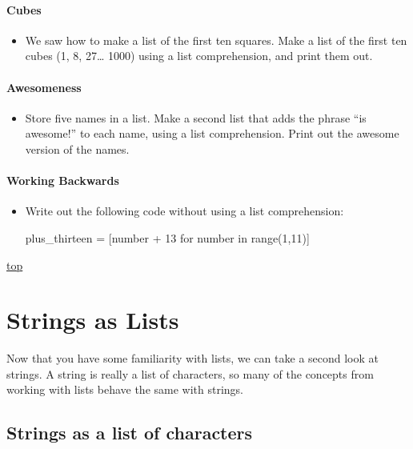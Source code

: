 \documentclass[11pt]{article}
\providecommand{\tightlist}{%
      \setlength{\itemsep}{0pt}\setlength{\parskip}{0pt}}
\begin{document}
\hypertarget{cubes}{%
\paragraph{Cubes}\label{cubes}}

\begin{itemize}
\tightlist
\item
  We saw how to make a list of the first ten squares. Make a list of the
  first ten cubes (1, 8, 27\ldots{} 1000) using a list comprehension,
  and print them out.
\end{itemize}

\hypertarget{awesomeness}{%
\paragraph{Awesomeness}\label{awesomeness}}

\begin{itemize}
\tightlist
\item
  Store five names in a list. Make a second list that adds the phrase
  ``is awesome!'' to each name, using a list comprehension. Print out
  the awesome version of the names.
\end{itemize}

\hypertarget{working-backwards}{%
\paragraph{Working Backwards}\label{working-backwards}}

\begin{itemize}
\item
  Write out the following code without using a list comprehension:

  plus\_thirteen = {[}number + 13 for number in range(1,11){]}
\end{itemize}

    \protect\hyperlink{}{top}

    \hypertarget{strings-as-lists}{%
\section{Strings as Lists}\label{strings-as-lists}}

Now that you have some familiarity with lists, we can take a second look
at strings. A string is really a list of characters, so many of the
concepts from working with lists behave the same with strings.

    \hypertarget{strings-as-a-list-of-characters}{%
\subsection{Strings as a list of
characters}\label{strings-as-a-list-of-characters}}
\end{document}
